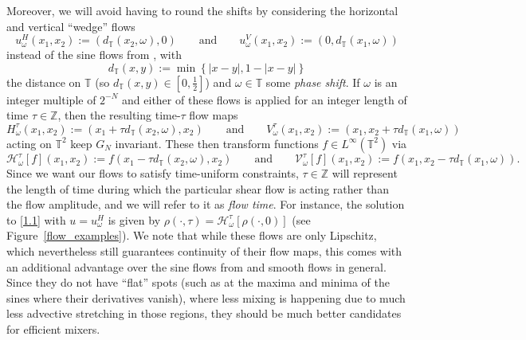 \documentclass[12pt]{article}
\numberwithin{figure}{section}
\numberwithin{equation}{section}
\newcommand{\beq}{\begin{equation}}
\newcommand{\eeq}{\end{equation}}
\newcommand{\lb}{\label}
\newcommand{\bbZ}{{\mathbb{Z}}}
\newcommand{\bbT}{{\mathbb{T}}}
\newcommand{\calH}{{\mathcal{H}}}
\newcommand{\calV}{{\mathcal{V}}}
\begin{document}
Moreover, we will avoid having to round the shifts by considering the
horizontal and vertical  ``wedge'' flows
\beq \lb{1.3}
    u^H_{\omega}\left(    x_1,x_2\right) := \left( d_{\mathbb{T}}(x_2, \omega), 0 \right) \qquad\text{and}\qquad
    u^V_{\omega}\left(    x_1,x_2\right) := \left( 0, d_{\mathbb{T}}(x_1, \omega) \right)
 \eeq
instead of the sine flows from \cite{Pie}, with 
\[
d_{\mathbb{T}}(x,y) := \min \left\{ |x - y|, 1 - |x - y| \right\}
\]
 the distance on $\bbT$ (so $d_{\mathbb{T}}(x,y)\in [0,\frac 12 ]$) and $\omega\in\bbT$ some {\it phase shift}.  If $\omega$ is an integer multiple of $2^{-N}$ and either of these flows is applied for an integer length of time $\tau\in\bbZ$, then the resulting time-$\tau$ flow maps
\beq \lb{1.4}
    H_{\omega}^{\tau}\left(    x_1,x_2\right) := \left(x_1+ \tau d_{\mathbb{T}}(x_2, \omega), x_2\right) \qquad\text{and}\qquad
    V_{\omega}^{\tau}\left(x_1,x_2\right) :=\left(x_1, x_2+ \tau d_{\mathbb{T}}(x_1, \omega) \right)
\eeq
acting on $\bbT^2$ keep $G_N$  invariant. 
These then transform functions $f\in L^\infty(\bbT^2)$ via
\beq \lb{1.6}
    \calH_{\omega}^{\tau}[f] \left(    x_1,x_2\right) := f\left(x_1- \tau d_{\mathbb{T}}(x_2, \omega), x_2\right) \qquad\text{and}\qquad
    \calV_{\omega}^{\tau}[f] \left(x_1,x_2\right) := f\left(x_1, x_2- \tau d_{\mathbb{T}}(x_1, \omega) \right).
\eeq
Since we want our flows to satisfy time-uniform constraints,  $\tau\in\bbZ$ will represent the length of time  during which the particular shear flow is acting rather than the flow amplitude, and we will refer to it as \textit{flow time}.  For instance, the solution to \eqref{1.1} with $u=u_\omega^H$ is given by $\rho(\cdot,\tau)=\calH_{\omega}^{\tau}[\rho(\cdot,0)]$ (see Figure~\ref{flow_examples}).  We note that while these flows are only Lipschitz, which nevertheless still guarantees continuity of their flow maps, this comes with an additional advantage over the sine flows from \cite{Pie} and smooth flows in general.  Since they do not have ``flat'' spots (such as at the maxima and minima of the sines where their derivatives vanish), where less mixing is happening due to much less advective stretching in those regions, they should be much better candidates for efficient mixers.
\end{document}
